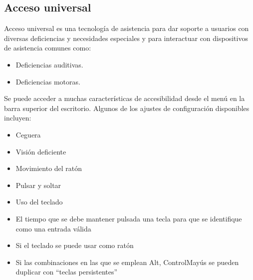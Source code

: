 \subsection{Acceso universal}
Acceso universal es una tecnología de asistencia para dar soporte a usuarios con diversas deficiencias y necesidades especiales y para interactuar con dispositivos de asistencia comunes como:
\begin{itemize}
\item Deficiencias auditivas.
\item Deficiencias motoras.
\end{itemize} 
Se puede acceder a muchas características de accesibilidad desde el menú en la barra superior del escritorio.
Algunos de los ajustes de configuración disponibles incluyen:
\begin{itemize}
\item Ceguera
\item Visión deficiente
\item Movimiento del ratón
\item Pulsar y soltar
\item Uso del teclado
\item El tiempo que se debe mantener pulsada una tecla para que se identifique como
una entrada válida
\item Si el teclado se puede usar como ratón
\item Si las combinaciones en las que se emplean Alt, ControlMayús se pueden duplicar con “teclas persistentes”
\end{itemize}
